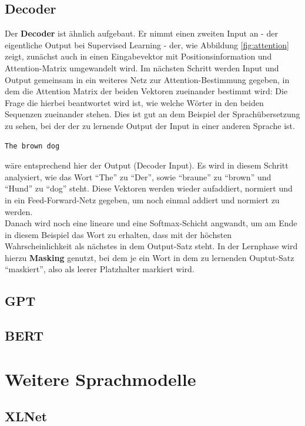 \subsection*{Decoder}
Der \textbf{Decoder} ist \"ahnlich aufgebaut. Er nimmt einen zweiten Input an - der eigentliche Output bei Supervised Learning - der, wie Abbildung \ref{fig:attention} zeigt, zun\"achst auch in einen Eingabevektor mit Positionsinformation und Attention-Matrix umgewandelt wird. Im n\"achsten Schritt werden Input und Output gemeinsam in ein weiteres Netz zur Attention-Bestimmung gegeben, in dem die Attention Matrix der beiden Vektoren zueinander bestimmt wird: Die Frage die hierbei beantwortet wird ist, wie welche W\"orter in den beiden Sequenzen zueinander stehen. Dies ist gut an dem Beispiel der Sprach\"ubersetzung zu sehen, bei der der zu lernende Output der Input in einer anderen Sprache ist.
\begin{verbatim} 
The brown dog
\end{verbatim} 
w\"are entsprechend hier der Output (Decoder Input). Es wird in diesem Schritt analysiert, wie das Wort "`The"' zu "`Der"', sowie "`braune"' zu "`brown"' und "`Hund"' zu "`dog"' steht.
Diese Vektoren werden wieder aufaddiert, normiert und in ein Feed-Forward-Netz gegeben, um noch einmal addiert und normiert zu werden.\\
Danach wird noch eine lineare und eine Softmax-Schicht angwandt, um am Ende in diesem Beispiel das Wort zu erhalten, dass mit der h\"ochsten Wahrscheinlichkeit als n\"achstes in dem Output-Satz steht. In der Lernphase wird hierzu \textbf{Masking} genutzt, bei dem je ein Wort in dem zu lernenden Ouptut-Satz "`maskiert"', also als leerer Platzhalter markiert wird.



\subsection{GPT}



\subsection{BERT}

\section{Weitere Sprachmodelle}

\subsection{XLNet}